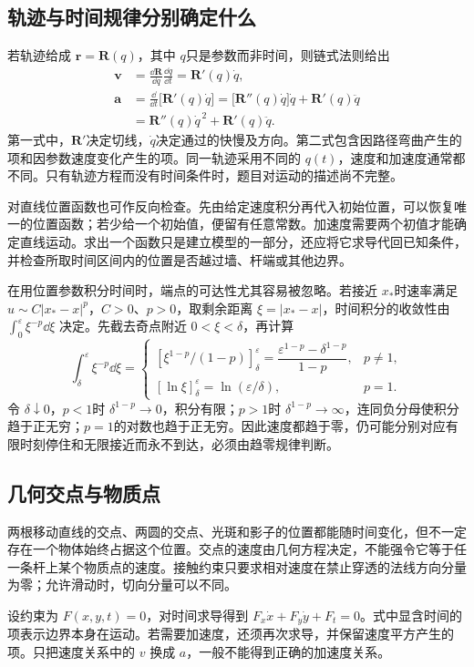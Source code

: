 \subsection{轨迹与时间规律分别确定什么}
若轨迹给成 $\bm r=\bm R(q)$，其中 $q$只是参数而非时间，则链式法则给出
\begin{align*}
\bm v&=\frac{\dd\bm R}{\dd q}\frac{\dd q}{\dd t}=\bm R'(q)\dot q,\\
\bm a&=\frac{\dd}{\dd t}\bigl[\bm R'(q)\dot q\bigr]
=\bigl[\bm R''(q)\dot q\bigr]\dot q+\bm R'(q)\ddot q\\
&=\bm R''(q)\dot q^{\,2}+\bm R'(q)\ddot q.
\end{align*}
第一式中，$\bm R'$决定切线，$\dot q$决定通过的快慢及方向。第二式包含因路径弯曲产生的项和因参数速度变化产生的项。同一轨迹采用不同的 $q(t)$，速度和加速度通常都不同。只有轨迹方程而没有时间条件时，题目对运动的描述尚不完整。

对直线位置函数也可作反向检查。先由给定速度积分再代入初始位置，可以恢复唯一的位置函数；若少给一个初始值，便留有任意常数。加速度需要两个初值才能确定直线运动。求出一个函数只是建立模型的一部分，还应将它求导代回已知条件，并检查所取时间区间内的位置是否越过墙、杆端或其他边界。

在用位置参数积分时间时，端点的可达性尤其容易被忽略。若接近 $x_*$时速率满足 $u\sim C|x_*-x|^p$，$C>0$、$p>0$，取剩余距离 $\xi=|x_*-x|$，时间积分的收敛性由 $\int_0^\varepsilon \xi^{-p}\dd\xi$ 决定。先截去奇点附近 $0<\xi<\delta$，再计算
\[
 \int_\delta^\varepsilon \xi^{-p}\dd\xi
 =\begin{cases}
 [\xi^{1-p}/(1-p)]_\delta^\varepsilon
 =\dfrac{\varepsilon^{1-p}-\delta^{1-p}}{1-p},&p\ne1,\\[4pt]
 [\ln\xi]_\delta^\varepsilon=\ln(\varepsilon/\delta),&p=1.
 \end{cases}
\]
令 $\delta\downarrow0$，$p<1$时 $\delta^{1-p}\to0$，积分有限；$p>1$时 $\delta^{1-p}\to\infty$，连同负分母使积分趋于正无穷；$p=1$的对数也趋于正无穷。因此速度都趋于零，仍可能分别对应有限时刻停住和无限接近而永不到达，必须由趋零规律判断。

\subsection{几何交点与物质点}
两根移动直线的交点、两圆的交点、光斑和影子的位置都能随时间变化，但不一定存在一个物体始终占据这个位置。交点的速度由几何方程决定，不能强令它等于任一条杆上某个物质点的速度。接触约束只要求相对速度在禁止穿透的法线方向分量为零；允许滑动时，切向分量可以不同。

设约束为 $F(x,y,t)=0$，对时间求导得到 $F_x\dot x+F_y\dot y+F_t=0$。式中显含时间的项表示边界本身在运动。若需要加速度，还须再次求导，并保留速度平方产生的项。只把速度关系中的 $v$ 换成 $a$，一般不能得到正确的加速度关系。

